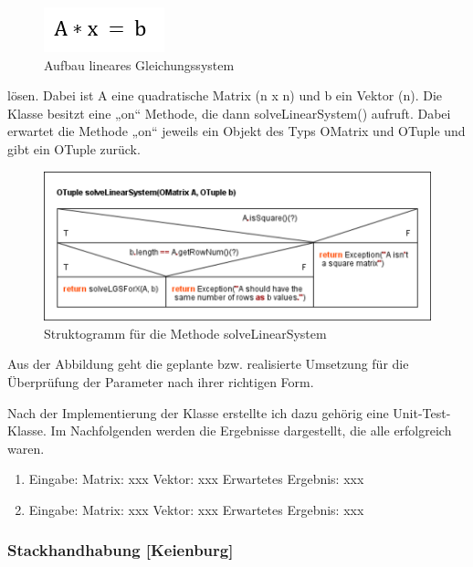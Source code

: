 \begin{figure}[h]
	\includegraphics[scale=1]{img/gleichungssystem-loesen}
	\caption[Aufbau lineares Gleichungssystem]{Aufbau lineares Gleichungssystem\footnotemark}
\end{figure}

lösen. Dabei ist A eine quadratische Matrix (n x n) und b ein Vektor (n).
Die Klasse besitzt eine „on“ Methode, die dann solveLinearSystem() aufruft. Dabei erwartet die Methode „on“ jeweils ein Objekt des Typs OMatrix und OTuple und gibt ein OTuple zurück. 

\begin{figure}[h]
	\includegraphics[width=\columnwidth]{img/solveLinearSystem}
	\caption[Struktogramm für die Methode solveLinearSystem]{Struktogramm für die Methode solveLinearSystem\footnotemark}
\end{figure}

Aus der Abbildung geht die geplante bzw. realisierte Umsetzung für die Überprüfung der Parameter nach ihrer richtigen Form. 

Nach der Implementierung der Klasse erstellte ich dazu gehörig eine Unit-Test-Klasse. Im Nachfolgenden werden die Ergebnisse dargestellt, die alle erfolgreich waren. 
\begin{enumerate}
	\item Eingabe: Matrix: xxx  Vektor: xxx Erwartetes Ergebnis: xxx
	\item Eingabe: Matrix: xxx Vektor: xxx Erwartetes Ergebnis: xxx
\end{enumerate}


\subsubsection{Stackhandhabung [Keienburg]}

